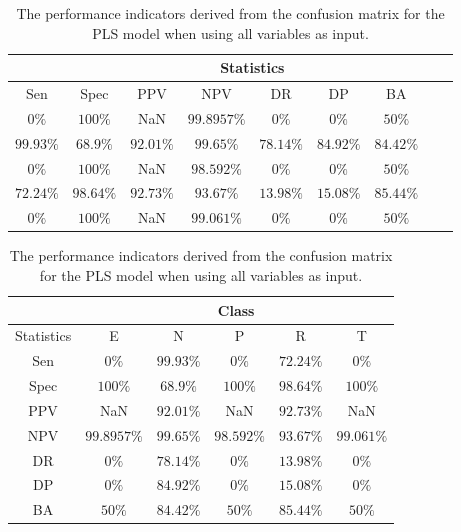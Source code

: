 \begin{table}[!ht]
	\centering
	\begin{tabular}{|c|c|c|c|c|c|c|c|c|}
		\hline
		 & \multicolumn{7}{c|}{Statistics} \\ \hline
		Sen & Spec & PPV & NPV & DR & DP & BA \\ \hline
		$0\%$ & $100\%$ & NaN & $99.8957\%$ & $0\%$ & $0\%$ & $50\%$ \\ \hline
		$99.93\%$ & $68.9\%$ & $92.01\%$ & $99.65\%$ & $78.14\%$ & $84.92\%$ & $84.42\%$ \\ \hline
		$0\%$ & $100\%$ & NaN & $98.592\%$ & $0\%$ & $0\%$ & $50\%$ \\ \hline
		$72.24\%$ & $98.64\%$ & $92.73\%$ & $93.67\%$ & $13.98\%$ & $15.08\%$ & $85.44\%$ \\ \hline
		$0\%$ & $100\%$ & NaN & $99.061\%$ & $0\%$ & $0\%$ & $50\%$ \\ \hline
	\end{tabular}
	\caption{The performance indicators derived from the confusion matrix for the PLS model when using all variables as input.}
	\label{tab:cs:all:pls}
\end{table}

\begin{table}[!ht]
	\centering
	\begin{tabular}{|c|c|c|c|c|c|}
		\hline
		 & \multicolumn{5}{c|}{Class} \\ \hline
		Statistics & E & N & P & R & T \\ \hline
		Sen & $0\%$ & $99.93\%$ & $0\%$ & $72.24\%$ & $0\%$ \\ \hline
		Spec & $100\%$ & $68.9\%$ & $100\%$ & $98.64\%$ & $100\%$ \\ \hline
		PPV & NaN & $92.01\%$ & NaN & $92.73\%$ & NaN \\ \hline
		NPV & $99.8957\%$ & $99.65\%$ & $98.592\%$ & $93.67\%$ & $99.061\%$ \\ \hline
		DR & $0\%$ & $78.14\%$ & $0\%$ & $13.98\%$ & $0\%$ \\ \hline
		DP & $0\%$ & $84.92\%$ & $0\%$ & $15.08\%$ & $0\%$ \\ \hline
		BA & $50\%$ & $84.42\%$ & $50\%$ & $85.44\%$ & $50\%$ \\ \hline
	\end{tabular}
	\caption{The performance indicators derived from the confusion matrix for the PLS model when using all variables as input.}
	\label{tab:cs:reverse:all:pls}
\end{table}

